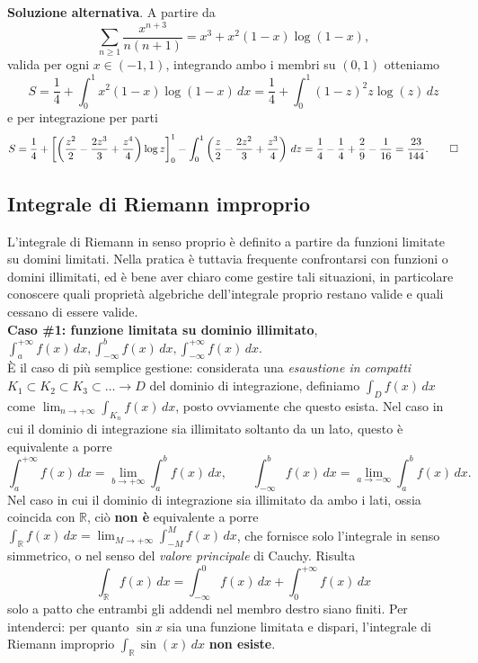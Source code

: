 \documentclass[a4paper,twoside]{article}
\newcommand{\R}{\mathbb{R}}
\theoremstyle{definition}
\numberwithin{theorem}{section}
\begin{document}
\textbf{Soluzione alternativa}. A partire da 
$$ \sum_{n\geq 1}\frac{x^{n+3}}{n(n+1)} = x^3+x^2(1-x)\log(1-x), $$
valida per ogni $x\in(-1,1)$, integrando ambo i membri su $(0,1)$ otteniamo 
$$ S = \frac{1}{4}+\int_{0}^{1}x^2(1-x)\log(1-x)\,dx = \frac{1}{4}+\int_{0}^{1}(1-z)^2 z \log(z)\,dz  $$
e per integrazione per parti 
$$ S = \frac{1}{4}+\left[\left(\frac{z^2}{2}-\frac{2z^3}{3}+\frac{z^4}{4}\right)\log z\right]_{0}^{1}-\int_{0}^{1}\left(\frac{z}{2}-\frac{2z^2}{3}+\frac{z^3}{4}\right)\,dz=\frac{1}{4}-\frac{1}{4}+\frac{2}{9}-\frac{1}{16} = \frac{23}{144}.\qed$$


\subsection{Integrale di Riemann improprio}
L'integrale di Riemann in senso proprio è definito a partire da funzioni limitate su domini limitati. Nella pratica è tuttavia frequente confrontarsi con funzioni o domini illimitati, ed è bene aver chiaro come gestire tali situazioni, in particolare conoscere quali proprietà algebriche dell'integrale proprio restano valide e quali cessano di essere valide.\\

\textbf{Caso \#1: funzione limitata su dominio illimitato}, $\int_{a}^{+\infty}f(x)\,dx, \int_{-\infty}^{b}f(x)\,dx, \int_{-\infty}^{+\infty}f(x)\,dx.$\\
È il caso di più semplice gestione: considerata una \emph{esaustione in compatti} $K_1\subset K_2 \subset K_3 \subset \ldots \to D$ del dominio di integrazione, definiamo $\int_D f(x)\,dx$ come $\lim_{n\to +\infty}\int_{K_n}f(x)\,dx$, posto ovviamente che questo esista. Nel caso in cui il dominio di integrazione sia illimitato soltanto da un lato, questo è equivalente a porre
$$ \int_{a}^{+\infty}f(x)\,dx = \lim_{b\to +\infty}\int_{a}^{b}f(x)\,dx,\qquad \int_{-\infty}^{b}f(x)\,dx = \lim_{a\to -\infty}\int_{a}^{b}f(x)\,dx. $$
Nel caso in cui il dominio di integrazione sia illimitato da ambo i lati, ossia coincida con $\R$, ciò \textbf{non è} equivalente a porre $\int_{\R}f(x)\,dx = \lim_{M\to +\infty}\int_{-M}^{M}f(x)\,dx$, che fornisce solo l'integrale in senso simmetrico, o nel senso del \emph{valore principale} di Cauchy. Risulta 
$$ \int_{\R}f(x)\,dx = \int_{-\infty}^{0}f(x)\,dx + \int_{0}^{+\infty} f(x)\,dx $$
solo a patto che entrambi gli addendi nel membro destro siano finiti. Per intenderci: per quanto $\sin x$ sia una funzione limitata e dispari, l'integrale di Riemann improprio $\int_{\R}\sin(x)\,dx$ \textbf{non esiste}.\\
\end{document}
